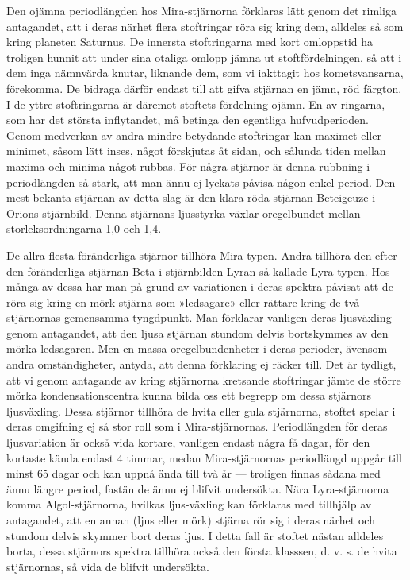 \documentclass[a4paper, 12pt, oneside, swedish]{article}
\begin{document}
Den ojämna periodlängden hos Mira-stjärnorna förklaras lätt genom det rimliga antagandet, att i deras närhet flera stoftringar röra sig kring dem, alldeles så som kring planeten Saturnus. De innersta stoftringarna med kort omloppstid ha troligen hunnit att under sina otaliga omlopp jämna ut stoftfördelningen, så att i dem inga nämnvärda knutar, liknande dem, som vi iakttagit hos kometsvansarna, förekomma. De bidraga därför endast till att gifva stjärnan en jämn, röd färgton. I de yttre stoftringarna är däremot stoftets fördelning ojämn. En av ringarna, som har det största inflytandet, må betinga den egentliga hufvudperioden. Genom medverkan av andra mindre betydande stoftringar kan maximet eller minimet, såsom lätt inses, något förskjutas åt sidan, och sålunda tiden mellan maxima och minima något rubbas. För några stjärnor är denna rubbning i periodlängden så stark, att man ännu ej lyckats påvisa någon enkel period. Den mest bekanta stjärnan av detta slag är den klara röda stjärnan Beteigeuze i Orions stjärnbild. Denna stjärnans ljusstyrka växlar oregelbundet mellan storleksordningarna 1,0 och 1,4.

De allra flesta föränderliga stjärnor tillhöra Mira-typen. Andra tillhöra den efter den föränderliga stjärnan Beta i stjärnbilden Lyran så kallade Lyra-typen. Hos många av dessa har man på grund av variationen i deras spektra påvisat att de röra sig kring en mörk stjärna som »ledsagare» eller rättare kring de två stjärnornas gemensamma tyngdpunkt. Man förklarar vanligen deras ljusväxling genom antagandet, att den ljusa stjärnan stundom delvis bortskymmes av den mörka ledsagaren. Men en massa oregelbundenheter i deras perioder, ävensom andra omständigheter, antyda, att denna förklaring ej räcker till. Det är tydligt, att vi genom antagande av kring stjärnorna kretsande stoftringar jämte de större mörka kondensationscentra kunna bilda oss ett begrepp om dessa stjärnors ljusväxling. Dessa stjärnor tillhöra de hvita eller gula stjärnorna, stoftet spelar i deras omgifning ej så stor roll som i Mira-stjärnornas. Periodlängden för deras ljusvariation är också vida kortare, vanligen endast några få dagar, för den kortaste kända endast 4 timmar, medan Mira-stjärnornas periodlängd uppgår till minst 65 dagar och kan uppnå ända till två år --- troligen finnas sådana med ännu längre period, fastän de ännu ej blifvit undersökta. Nära Lyra-stjärnorna komma Algol-stjärnorna, hvilkas ljus-växling kan förklaras med tillhjälp av antagandet, att en annan (ljus eller mörk) stjärna rör sig i deras närhet och stundom delvis skymmer bort deras ljus. I detta fall är stoftet nästan alldeles borta, dessa stjärnors spektra tillhöra också den första klasssen, d. v. s. de hvita stjärnornas, så vida de blifvit undersökta.
\end{document}

